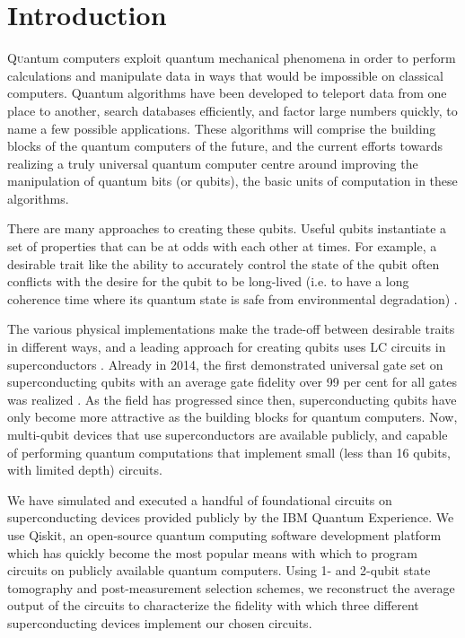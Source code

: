 \section{Introduction}

\lettrine[nindent=0em,lines=3]{Q} uantum computers exploit quantum mechanical
phenomena in order to perform calculations and manipulate data in ways that
would be impossible on classical computers. Quantum algorithms have been
developed to teleport data from one place to another, search databases
efficiently, and factor large numbers quickly, to name a few possible
applications. These algorithms will comprise the building blocks of the quantum
computers of the future, and the current efforts towards realizing a truly
universal quantum computer centre around improving the manipulation of quantum
bits (or qubits), the basic units of computation in these algorithms.

There are many approaches to creating these qubits. Useful qubits instantiate a
set of properties that can be at odds with each other at times. For example, a
desirable trait like the ability to accurately control the state of the qubit
often conflicts with the desire for the qubit to be long-lived (i.e. to have a
long coherence time where its quantum state is safe from environmental
degradation) \cite{nielsen10_quant}.

The various physical implementations make the trade-off between desirable traits
in different ways, and a leading approach for creating qubits uses LC circuits
in superconductors \cite{kjaergaard19_super_qubit}. Already in 2014, the first
demonstrated universal gate set on superconducting qubits with an average gate
fidelity over 99 per cent for all gates was realized
\cite{barends14_super_quant_circuit_at_surfac}. As the field has progressed
since then, superconducting qubits have only become more attractive as the
building blocks for quantum computers. Now, multi-qubit devices that use
superconductors are available publicly, and capable of performing quantum
computations that implement small (less than 16 qubits, with limited depth)
circuits.

We have simulated and executed a handful of foundational circuits on
superconducting devices provided publicly by the IBM Quantum Experience. We use
Qiskit, an open-source quantum computing software development platform which has
quickly become the most popular means with which to program circuits on publicly
available quantum computers. Using 1- and 2-qubit state tomography and
post-measurement selection schemes, we reconstruct the average output of the
circuits to characterize the fidelity with which three different superconducting
devices implement our chosen circuits.


